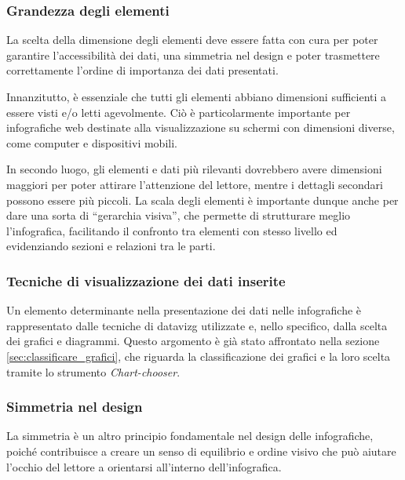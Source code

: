 \subsubsection{Grandezza degli elementi}
La scelta della dimensione degli elementi deve essere fatta con cura per poter garantire l'accessibilità dei dati, una simmetria nel design e poter trasmettere correttamente l'ordine di importanza 
dei dati presentati.

Innanzitutto, è essenziale che tutti gli elementi abbiano dimensioni sufficienti a essere visti e/o letti agevolmente. Ciò è particolarmente importante per infografiche web destinate alla visualizzazione su schermi con
dimensioni diverse, come computer e dispositivi mobili.

In secondo luogo, gli elementi e dati più rilevanti dovrebbero avere dimensioni maggiori per poter attirare l'attenzione del lettore, mentre i dettagli secondari possono essere più piccoli.
La scala degli elementi è importante dunque anche per dare una sorta di ``gerarchia visiva'', che permette di strutturare meglio l'infografica, facilitando il confronto tra elementi con stesso livello ed evidenziando sezioni e 
relazioni tra le parti.

\subsubsection{Tecniche di visualizzazione dei dati inserite}
Un elemento determinante nella presentazione dei dati nelle infografiche è rappresentato dalle tecniche di \gls{datavizg} utilizzate e, nello specifico, dalla scelta dei grafici e diagrammi.
Questo argomento è già stato affrontato nella sezione \ref{sec:classificare_grafici}, che riguarda la classificazione dei grafici e la loro scelta tramite lo strumento \emph{Chart-chooser}.

\subsubsection{Simmetria nel design}
La simmetria è un altro principio fondamentale nel design delle infografiche, poiché contribuisce a creare un senso di equilibrio e ordine visivo che può aiutare l'occhio del lettore a orientarsi
all'interno dell'infografica.

